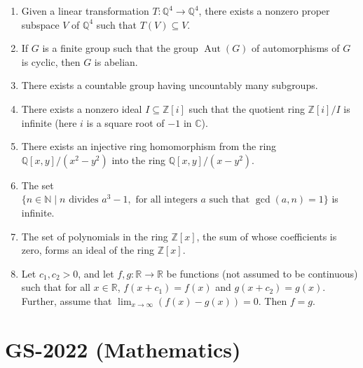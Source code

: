 \documentclass[11pt, a4paper]{article}
\begin{document}
\begin{enumerate}
  \item Given a linear transformation $T: \mathbb{Q}^4 \to \mathbb{Q}^4$, there exists a nonzero proper subspace $V$ of $\mathbb{Q}^4$ such that $T(V) \subseteq V$.
  \item If $G$ is a finite group such that the group $\operatorname{Aut}(G)$ of automorphisms of $G$ is cyclic, then $G$ is abelian.
  \item There exists a countable group having uncountably many subgroups.
  \item There exists a nonzero ideal $I \subseteq \mathbb{Z}[i]$ such that the quotient ring $\mathbb{Z}[i]/I$ is infinite (here $i$ is a square root of $-1$ in $\mathbb{C}$).
  \item There exists an injective ring homomorphism from the ring $\mathbb{Q}[x, y]/(x^2 - y^2)$ into the ring $\mathbb{Q}[x, y]/(x - y^2)$.
  \item The set $\{n \in \mathbb{N} \mid n \text{ divides } a^3 - 1, \text{ for all integers } a \text{ such that } \gcd(a, n) = 1\}$ is infinite.
  \item The set of polynomials in the ring $\mathbb{Z}[x]$, the sum of whose coefficients is zero, forms an ideal of the ring $\mathbb{Z}[x]$.
  \item Let $c_1, c_2 > 0$, and let $f, g: \mathbb{R} \to \mathbb{R}$ be functions (not assumed to be continuous) such that for all $x \in \mathbb{R}$, $f(x + c_1) = f(x)$ and $g(x + c_2) = g(x)$. Further, assume that $\lim_{x \to \infty} (f(x) - g(x)) = 0$. Then $f = g$.
\end{enumerate}

\newpage

\section{GS-2022 (Mathematics)}
\end{document}
